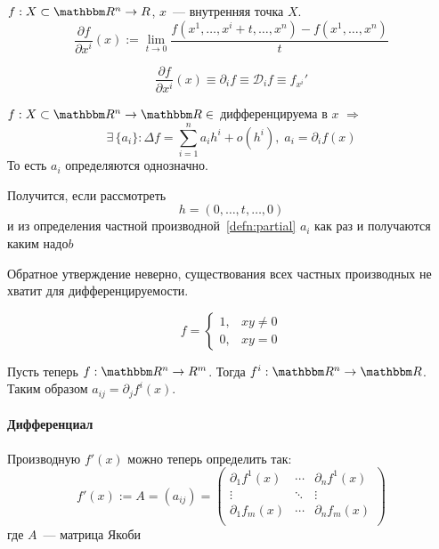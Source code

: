 \documentclass[12pt]{../../notes}
\begin{document}
\begin{defn}\label{defn:partial}
  $f:X \subset \R^n \to R$, $x$~--- внутренняя точка $X$.
  \[
    \frac{\partial f}{\partial x^i}(x) 
    := \lim_{t \to 0} \frac{f(x^1, \dotsc, x^i + t, \dotsc, x^n) - f(x^1, \dotsc, x^n)}{t}
  \]
\end{defn}

\begin{rem*}
  \[
    \frac{\partial f}{\partial x^i}(x) \equiv \partial_i f \equiv \mathcal{D}_i f \equiv f_{x^i}'
  \]
\end{rem*}

\begin{thrm}\label{thrm:diffcoefpart}
  $f : X \subset \R^n \to \R \in $ дифференцируема в $x$ $\Rightarrow$ 
  \[
    \exists\, \{a_i\} \colon \Delta f = \sum_{i=1}^{n} a_i h^i + o(h^i) , \; a_i = \partial_i f(x)
  \]
  То есть $a_i$ определяются однозначно.
\end{thrm}
\begin{ittproof}
  Получится, если рассмотреть 
  \[
    h = (0, \dotsc, t, \dotsc, 0)
  \]
  и из определения частной производной~\ref{defn:partial} $a_i$ как раз и получаются каким надо$b$
\end{ittproof}

\begin{rem*}
  Обратное утверждение неверно, существования всех частных производных не хватит для дифференцируемости.
\end{rem*}
\begin{exmp}\label{exmp:partialinsuff}
  \[
    f = \begin{cases}
      1, &xy \neq 0 \\
      0, &xy = 0
    \end{cases}
  \]
\end{exmp}

\begin{imp}
  Пусть теперь $f:\R^n \to R^m$. Тогда $f^i : \R^n \to \R$. Таким образом $a_{ij} = \partial_j f^i(x)$.
\end{imp}

\paragraph{Дифференциал}

\begin{defn}\label{defn:derivativeRn}
  Производную $f'(x)$ можно теперь определить так:
  \[
    f'(x) := A = (a_{ij}) = 
    \begin{pmatrix}
      \partial_1 f^1(x) & \cdots & \partial_n f^1(x) \\
      \vdots            & \ddots & \vdots \\
      \partial_1 f_m(x) & \cdots & \partial_n f_m(x) \\
    \end{pmatrix}
  \]
  где $A$~--- матрица Якоби
\end{defn}
\end{document}
